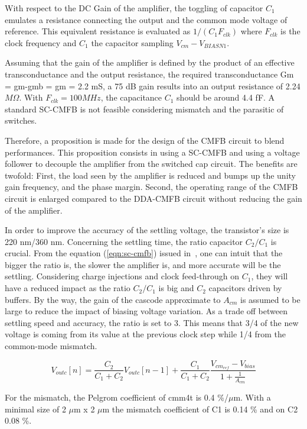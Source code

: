 With respect to the DC Gain of the amplifier, the toggling of capacitor \(C_1 \) emulates a resistance connecting the output and the common mode voltage of reference. This equivalent resistance is evaluated as \(1/(C_1 F_{clk}) \) where \(F_{clk} \) is the clock frequency and \(C_1 \) the capacitor sampling \(V_{cm}-V_{BIASN1}\). 

Assuming that the gain of the amplifier is defined by the product of an effective transconductance and the output resistance, the required transconductance Gm = gm-gmb = gm = 2.2 mS, a 75 dB gain results into an output resistance of 2.24 \(M\Omega \). With \(F_{clk} = 100 MHz \), the capacitance \(C_1 \) should be around 4.4 fF. A standard SC-CMFB is not feasible considering mismatch and the parasitic of switches.

Therefore, a proposition is made for the design of the CMFB circuit to blend performances. This proposition consists in using a SC-CMFB and using a voltage follower to decouple the amplifier from the switched cap circuit.
The benefits are twofold: First, the load seen by the amplifier is reduced and bumps up the unity gain frequency, and the phase margin. Second, the operating range of the CMFB circuit is enlarged compared to the DDA-CMFB circuit without reducing the gain of the amplifier.

In order to improve the accuracy of the settling voltage, the transistor's size is 220 nm/360 nm. Concerning the settling time, the ratio capacitor \(C_2/C_1 \) is crucial. From the equation (\ref{eqn:sc-cmfb}) issued in~\cite{Choksi2003}, one can intuit that the bigger the ratio is, the slower the amplifier is, and more accurate will be the settling. Considering charge injections and clock feed-through on \(C_1\), they will have a reduced impact as the ratio \(C_2/C_1\) is big and \(C_2\) capacitors driven by buffers. By the way, the gain of the cascode approximate to \(A_{cm} \) is assumed to be large to reduce the impact of biasing voltage variation. As a trade off between settling speed and accuracy, the ratio is set to 3. This means that 3/4 of the new  voltage is coming from its value at the previous clock step while 1/4 from the common-mode mismatch.

\begin{equation}
    \label{eqn:sc-cmfb}
V_{outc}[n] = \frac{C_2}{C_1+C_2} V_{outc}[n-1] + \frac{C_1}{C_1+C_2} \frac{V_{cm_{ref}}-V_{bias}}{1+\frac{1}{A_{cm}}}
\end{equation}

For the mismatch, the Pelgrom coefficient of cmm4t is 0.4 \%/\(\mu \)m. With a minimal size of 2 \(\mu \)m x 2 \(\mu \)m the mismatch coefficient of C1 is 0.14 \% and on C2 0.08 \%.

